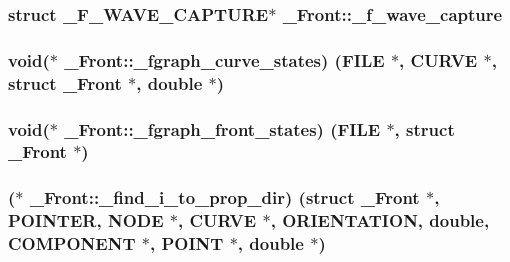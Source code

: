\subsubsection[{\texorpdfstring{\+\_\+f\+\_\+wave\+\_\+capture}{_f_wave_capture}}]{\setlength{\rightskip}{0pt plus 5cm}struct {\bf \+\_\+\+F\+\_\+\+W\+A\+V\+E\+\_\+\+C\+A\+P\+T\+U\+RE}$\ast$ \+\_\+\+Front\+::\+\_\+f\+\_\+wave\+\_\+capture}\hypertarget{struct___front_a8bb8fc2f84a375be8b45b904cd055401}{}\label{struct___front_a8bb8fc2f84a375be8b45b904cd055401}
\subsubsection[{\texorpdfstring{\+\_\+fgraph\+\_\+curve\+\_\+states}{_fgraph_curve_states}}]{\setlength{\rightskip}{0pt plus 5cm}void($\ast$ \+\_\+\+Front\+::\+\_\+fgraph\+\_\+curve\+\_\+states) (F\+I\+LE $\ast$, {\bf C\+U\+R\+VE} $\ast$, struct {\bf \+\_\+\+Front} $\ast$, double $\ast$)}\hypertarget{struct___front_ad92006d1e4ffaca59f63f146de99034f}{}\label{struct___front_ad92006d1e4ffaca59f63f146de99034f}
\subsubsection[{\texorpdfstring{\+\_\+fgraph\+\_\+front\+\_\+states}{_fgraph_front_states}}]{\setlength{\rightskip}{0pt plus 5cm}void($\ast$ \+\_\+\+Front\+::\+\_\+fgraph\+\_\+front\+\_\+states) (F\+I\+LE $\ast$, struct {\bf \+\_\+\+Front} $\ast$)}\hypertarget{struct___front_ab7a8029aef0d1a8544a6ce9e1c23ab3a}{}\label{struct___front_ab7a8029aef0d1a8544a6ce9e1c23ab3a}
\subsubsection[{\texorpdfstring{\+\_\+find\+\_\+i\+\_\+to\+\_\+prop\+\_\+dir}{_find_i_to_prop_dir}}]{($\ast$ \+\_\+\+Front\+::\+\_\+find\+\_\+i\+\_\+to\+\_\+prop\+\_\+dir) (struct {\bf \+\_\+\+Front} $\ast$, {\bf P\+O\+I\+N\+T\+ER}, {\bf N\+O\+DE} $\ast$, {\bf C\+U\+R\+VE} $\ast$, {\bf O\+R\+I\+E\+N\+T\+A\+T\+I\+ON}, double, {\bf C\+O\+M\+P\+O\+N\+E\+NT} $\ast$, {\bf P\+O\+I\+NT} $\ast$, double $\ast$)}\hypertarget{struct___front_ae4076f7eef32ef7693d7bc07df591e26}{}\label{struct___front_ae4076f7eef32ef7693d7bc07df591e26}
